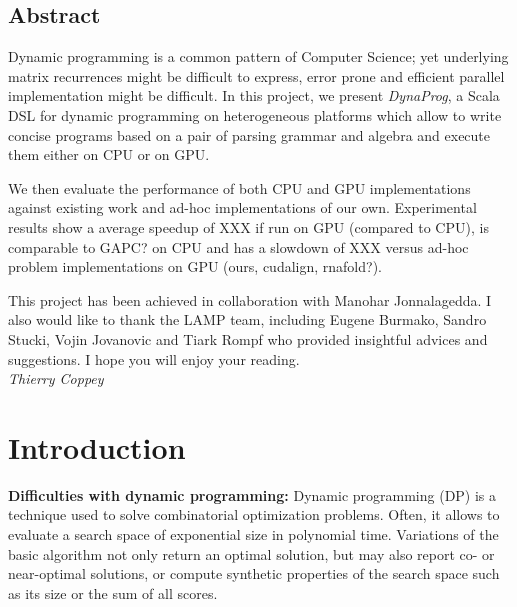 

% 


\subsection*{Abstract}
Dynamic programming is a common pattern of Computer Science; yet underlying matrix recurrences might be difficult to express, error prone and efficient parallel implementation might be difficult. In this project, we present \textit{DynaProg}, a Scala DSL for dynamic programming on heterogeneous platforms which allow to write concise programs based on a pair of parsing grammar and algebra and execute them either on CPU or on GPU.

We then evaluate the performance of both CPU and GPU implementations against existing work and ad-hoc implementations of our own. Experimental results show a average speedup of {\color{red} XXX} if run on GPU (compared to CPU), {\color{red} is comparable to GAPC?} on CPU and has a slowdown of {\color{red} XXX} versus ad-hoc problem implementations on GPU {\color{red} (ours, cudalign, rnafold?)}.

\vfill
This project has been achieved in collaboration with Manohar Jonnalagedda. I also would like to thank the LAMP team, including Eugene Burmako, Sandro Stucki, Vojin Jovanovic and Tiark Rompf who provided insightful advices and suggestions. I hope you will enjoy your reading. \vspace{.3cm}\\
\textit{Thierry Coppey}

\newpage
\setcounter{tocdepth}{2} \tableofcontents
\newpage
\section{Introduction}
\textbf{Difficulties with dynamic programming:} Dynamic programming (DP) is a technique used to solve combinatorial optimization problems. Often, it allows to evaluate a search space of exponential size in polynomial time. Variations of the basic algorithm not only return an optimal solution, but may also report co- or near-optimal solutions, or compute synthetic properties of the search space such as its size or the sum of all scores.

